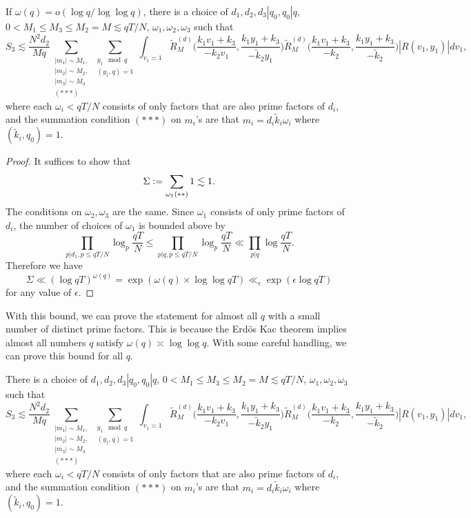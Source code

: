 \begin{corollary}\label{almostallek}
    If $\omega(q)=o(\log q /\log\log q)$, there is a choice of $d_1,d_2,d_3|q_0, q_0|q$, $0<M_1\leq M_3\leq M_2= M\lesssim qT/N$, $\omega_1,\omega_2,\omega_3$ such that  \[
        S_3\lesssim \frac{N^2d_2}{Mq} 
        \sum_{\substack{|m_1|\sim M_1,\\|m_2|\sim M_2,\\|m_3|\sim M_3\\
        (***)}}\sum_{\substack{y_1\mod q\\ (y_1,q)=1} }\int_{v_1\asymp 1}
        \tilde{R}_M^{(d)}\Big(\frac{k_1v_1+k_3}{-k_2v_1},\frac{k_1y_1+k_3}{-\tilde{k}_2y_1}\Big)\tilde{R}_M^{(d)}\Big(\frac{k_1v_1+k_3}{-k_2},\frac{k_1y_1+k_3}{-\tilde{k}_2}\Big)|R\left(v_1,y_1\right)| dv_1,
    \]
    where each $\omega_i<qT/N$ consists of only factors that are also prime factors of $d_i$, and the summation condition $(***)$ on $m_i$'s are that
    $m_i=d_i\tilde{k}_i\omega_i$ where $(\tilde{k}_i,q_0)=1$. 
\end{corollary}
\begin{proof}
    It suffices to show that \[
   \Sigma\mathrel{\mathop:}= \sum_{\omega_1 (**)} 1 \lesssim 1.
    \]
    The conditions on $\omega_2,\omega_3$ are the same. Since $\omega_1$ consists of only prime factors of $d_i$, the number of choices of $\omega_1$ is bounded above by\[
    \prod_{p|d_1, p\leq qT/N}\log_{p} \frac{qT}{N}\leq \prod_{p|q,p\leq qT/N}\log_{p} \frac{qT}{N} \ll \prod_{p|q} \log \frac{qT}{N}.
    \]
    Therefore we have \[
    \Sigma \ll (\log qT)^{\omega(q)} = \exp(\omega(q) \times \log \log qT) \ll_{\epsilon} \exp(\epsilon \log qT)
    \]
    for any value of $\epsilon$.
\end{proof}
With this bound, we can prove the statement for almost all $q$ with a small number of distinct prime factors. This is because the Erd\"os Kac theorem implies almost all numbers $q$ satisfy $\omega(q)\asymp \log \log q$.
With some careful handling, we can prove this bound for all $q$.
\begin{proposition}\label{allek}
   There is a choice of $d_1,d_2,d_3|q_0, q_0|q$, $0<M_1\leq M_3\leq M_2=M\lesssim qT/N$, $\omega_1,\omega_2,\omega_3$ such that  \[
        S_3\lesssim \frac{N^2d_2}{Mq} 
        \sum_{\substack{|m_1|\sim M_1,\\|m_2|\sim M_2,\\|m_3|\sim M_3\\
        (***)}}\sum_{\substack{y_1\mod q\\ (y_1,q)=1} }\int_{v_1\asymp 1}
        \tilde{R}_M^{(d)}\Big(\frac{k_1v_1+k_3}{-k_2v_1},\frac{k_1y_1+k_3}{-\tilde{k}_2y_1}\Big)\tilde{R}_M^{(d)}\Big(\frac{k_1v_1+k_3}{-k_2},\frac{k_1y_1+k_3}{-\tilde{k}_2}\Big)|R\left(v_1,y_1\right)| dv_1,
    \]
    where each $\omega_i<qT/N$ consists of only factors that are also prime factors of $d_i$, and the summation condition $(***)$ on $m_i$'s are that
    $m_i=d_i\tilde{k}_i\omega_i$ where $(\tilde{k}_i,q_0)=1$. 
\end{proposition}
